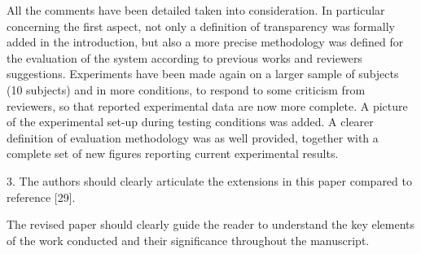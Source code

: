 

\begin{reply}
All the comments have been detailed taken into consideration.
In particular concerning the first aspect, not only a definition of transparency was formally added in the introduction, but also a more precise methodology was defined for the evaluation of the system according to previous works and reviewers suggestions.
Experiments have been made again on a larger sample of subjects (10 subjects) and in more conditions, to respond to some criticism from reviewers, so that reported experimental data are now more complete. A picture of the experimental set-up during testing conditions was added.
A clearer definition of evaluation methodology was as well provided, together with a complete set of new figures reporting current experimental results.
	
	
	
\end{reply}

\begin{editorpoint}
	3. The authors should clearly articulate the extensions in this paper
	compared to reference [29].
	
	The revised paper should clearly guide the reader to understand the key
	elements of the work conducted and their significance throughout the
	manuscript. 
	
\end{editorpoint}



